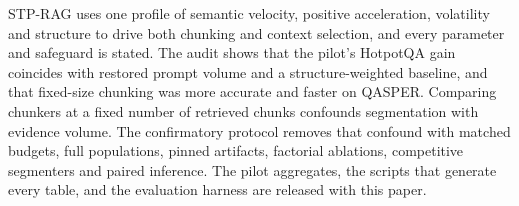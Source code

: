 \documentclass[conference,a4paper]{IEEEtran}
\begin{document}
STP-RAG uses one profile of semantic velocity, positive acceleration, volatility and structure to drive both chunking and context selection, and every parameter and safeguard is stated. The audit shows that the pilot's HotpotQA gain coincides with restored prompt volume and a structure-weighted baseline, and that fixed-size chunking was more accurate and faster on QASPER. Comparing chunkers at a fixed number of retrieved chunks confounds segmentation with evidence volume. The confirmatory protocol removes that confound with matched budgets, full populations, pinned artifacts, factorial ablations, competitive segmenters and paired inference. The pilot aggregates, the scripts that generate every table, and the evaluation harness are released with this paper.

\printbibliography
\end{document}
